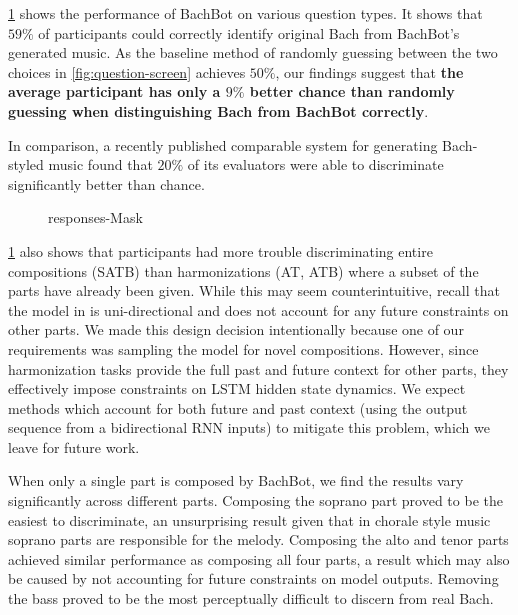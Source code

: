 
\cref{fig:responses-mask} shows the performance of BachBot on various question
types. It shows that $59\%$ of participants could correctly
identify original Bach from BachBot's generated music. As the baseline method
of randomly guessing between the two choices in \cref{fig:question-screen}
achieves $50\%$, our findings suggest that {\bf the average participant has only a
$9\%$ better chance than randomly guessing when
distinguishing Bach from BachBot correctly}.

 In comparison, a recently
published comparable system for generating Bach-styled music found that
$20\%$ of its evaluators were able to discriminate significantly better than chance.

\begin{figure}[tb]
  \centering
  
  \caption{responses-Mask}
  \label{fig:responses-mask}
\end{figure}

\cref{fig:responses-mask} also shows that participants had more trouble
discriminating entire compositions (SATB) than harmonizations (AT, ATB) where a
subset of the parts have already been given. While this may seem
counterintuitive, recall that the model in  is uni-directional
and does not account for any future constraints on other parts. We made
this design decision intentionally because one of our requirements was sampling
the model for novel compositions. However, since harmonization tasks provide
the full past and future context for other parts, they effectively impose constraints
on LSTM hidden state dynamics. We expect methods which account for both future and past
context (\eg using the output sequence from a bidirectional RNN inputs)
to mitigate this problem, which we leave for future work.

When only a single part is composed by BachBot, we find the results vary significantly
across different parts. Composing the soprano part proved to be the easiest to
discriminate, an unsurprising result given that in chorale style music soprano parts
are responsible for the melody. Composing the alto and tenor parts achieved
similar performance as composing all four parts, a result which may also be caused by
not accounting for future constraints on model outputs. Removing the bass proved
to be the most perceptually difficult to discern from real Bach.


